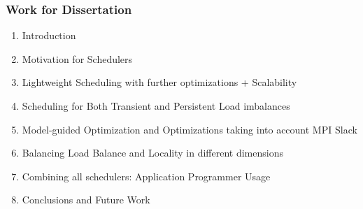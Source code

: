 \begin{frame}
\frametitle{Work for Dissertation} 

\begin{enumerate}
\item Introduction
\item Motivation for Schedulers
\item Lightweight Scheduling with further optimizations + Scalability  
\item Scheduling for Both Transient and Persistent Load imbalances
\item Model-guided Optimization and Optimizations taking into account MPI Slack
\item Balancing Load Balance and Locality in different dimensions
\item Combining all schedulers: Application Programmer Usage
\item Conclusions and Future Work
\end{enumerate} 
\end{frame} 
